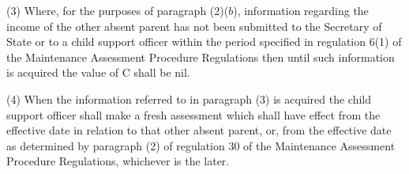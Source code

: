 \documentclass[12pt,a4paper]{article}
\begin{document}
(3) Where, for the purposes of paragraph (2)($b$), information regarding the income of the other absent parent has not been submitted to the Secretary of State or to a child support officer within the period specified in regulation 6(1) of the Maintenance Assessment Procedure Regulations then until such information is acquired the value of C shall be nil.

(4) When the information referred to in paragraph (3) is acquired the child support officer shall make a fresh assessment which shall have effect from the effective date in relation to that other absent 
parent, or, from the effective date as determined by paragraph (2) of regulation 30 of the Maintenance Assessment Procedure Regulations, whichever is the later.  %
\end{document}
